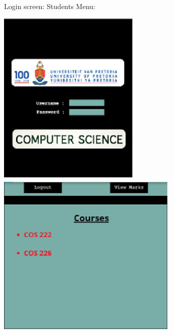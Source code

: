 \documentclass{article}
\begin{document}
\noindent Login screen:                        Students Menu:

\noindent \includegraphics*[width=2.70in, height=3.34in, keepaspectratio=false]{image1}   \includegraphics*[width=3.44in, height=3.10in, keepaspectratio=false]{image2}

\noindent 

\noindent 

\noindent 

\noindent 

\noindent 

\noindent 

\noindent 

\noindent 

\noindent 

\noindent 

\noindent 

\noindent 

\noindent 

\noindent 

\noindent 
\end{document}
